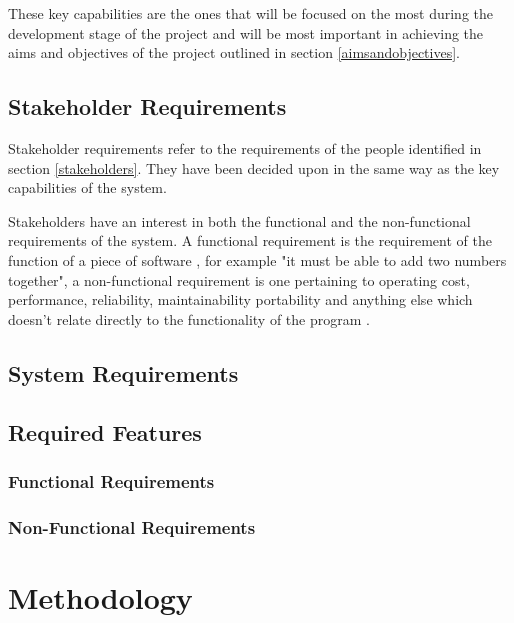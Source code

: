 \documentclass[11pt]{book}
\begin{document}
These key capabilities are the ones that will be focused on the most during the development stage of the project and will be most important in achieving the aims and objectives of the project outlined in section \ref{aimsandobjectives}.

\section{Stakeholder Requirements}
Stakeholder requirements refer to the requirements of the people identified in section \ref{stakeholders}. They have been decided upon in the same way as the key capabilities of the system. 

Stakeholders have an interest in both the functional and the non-functional requirements of the system. A functional requirement is the requirement of the function of a piece of software \cite{functionalrequirements}, for example "it must be able to add two numbers together", a non-functional requirement is one pertaining to operating cost, performance, reliability, maintainability portability and anything else which doesn't relate directly to the functionality of the program \cite{nonfunctionalrequirements}.

\section{System Requirements}

\section{Required Features}
\subsection{Functional Requirements}
\subsection{Non-Functional Requirements}


\chapter{Methodology}
\end{document}
